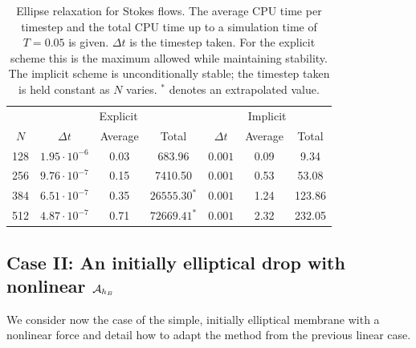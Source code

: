 \begin{table}
\caption{Ellipse relaxation for Stokes flows. The average CPU time per timestep and the total CPU time up to a simulation time of 
$T=0.05$ is given. $\Delta t$ is the timestep taken. For the explicit scheme this is the maximum allowed while maintaining stability. The implicit scheme is unconditionally stable; the timestep taken is held constant as $N$ varies.  $^*$ denotes an extrapolated value.}
\label{table:EllipseStokesSims}
\begin{center}
\begin{tabular}{|c |c c c| c c c|}
\hline
& \multicolumn{3}{|c|}{Explicit} & \multicolumn{3}{|c|}{Implicit}\\
$N$ & $\Delta t$ & Average & Total & $\Delta t$ & Average & Total\\
\hline
128 & $1.95\cdot 10^{-6}$ & 0.03 & 683.96 & $0.001$ & 0.09 & 9.34\\
256 & $9.76\cdot 10^{-7}$ & 0.15 & 7410.50 & $0.001$ & 0.53 &  53.08\\
384 & $6.51\cdot 10^{-7}$ & 0.35 & $26555.30^*$ & $0.001$ & 1.24 & 123.86\\
512 & $4.87\cdot 10^{-7}$ & 0.71 & $72669.41^*$ & $0.001$ & 2.32 & 232.05\\
\hline
\end{tabular}
\end{center}
\end{table}



\subsection{Case II: An initially elliptical drop with nonlinear $\mathcal{A}_{h_B}$}
\label{Sec:Nonlinear}
We consider now the case of the simple, initially elliptical membrane  with a nonlinear force and detail how to adapt the method from the previous linear case.

